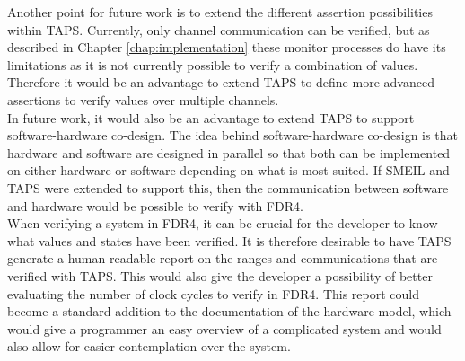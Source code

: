 Another point for future work is to extend the different assertion possibilities within TAPS. Currently, only channel communication can be verified, but as described in Chapter \ref{chap:implementation} %
these monitor processes do have its limitations as it is not currently possible to verify a combination of values. Therefore it would be an advantage to extend TAPS to define more advanced assertions to verify values over multiple channels. \\

In future work, it would also be an advantage to extend TAPS to support software-hardware co-design. The idea behind software-hardware co-design is that hardware and software are designed in parallel so that both can be implemented on either hardware or software depending on what is most suited. If SMEIL and TAPS were extended to support this, then the communication between software and hardware would be possible to verify with FDR4. \\

When verifying a system in FDR4, it can be crucial for the developer to know what values and states have been verified. It is therefore desirable to have TAPS generate a human-readable report on the ranges and communications that are verified with TAPS. This would also give the developer a possibility of better evaluating the number of clock cycles to verify in FDR4.
This report could become a standard addition to the documentation of the hardware model, which would give a programmer an easy overview of a complicated system and would also allow for easier contemplation over the system.